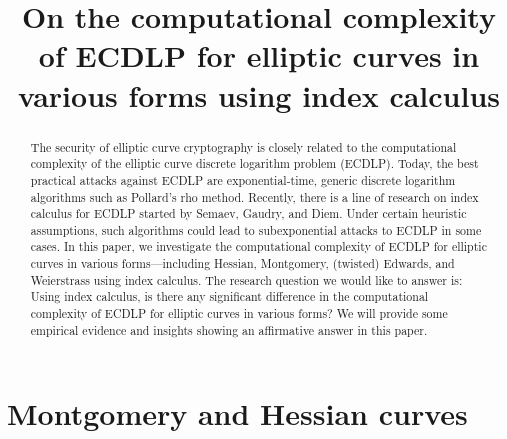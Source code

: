 \documentclass{llncs}
\begin{document}
%
\title{On the computational complexity of ECDLP for elliptic curves in
  various forms using index calculus}
%
%
%
%

\maketitle              %

\begin{abstract}
%
  The security of elliptic curve cryptography is closely related to
  the computational complexity of the elliptic curve discrete
  logarithm problem (ECDLP).
%
  Today, the best practical attacks against ECDLP are
  exponential-time, generic discrete logarithm algorithms such as
  Pollard's rho method.
%
  Recently, there is a line of research on index calculus for ECDLP
  started by Semaev, Gaudry, and
  Diem.
%
  Under certain heuristic assumptions, such algorithms could lead to
  subexponential attacks to ECDLP in some
  cases.
%
  In this paper, we investigate the computational complexity of ECDLP
  for elliptic curves in various forms---including
  Hessian,
  Montgomery, (twisted)
  Edwards,
  and Weierstrass using index calculus.
%
  The research question we would like to answer is: Using index
  calculus, is there any significant difference in the computational
  complexity of ECDLP for elliptic curves in various forms?
%
  We will provide some empirical evidence and insights showing an
  affirmative answer in this paper.
%
\end{abstract}



\section{Montgomery and Hessian curves}
\label{sec:montgomery-hessian}






%
%


\end{document}
